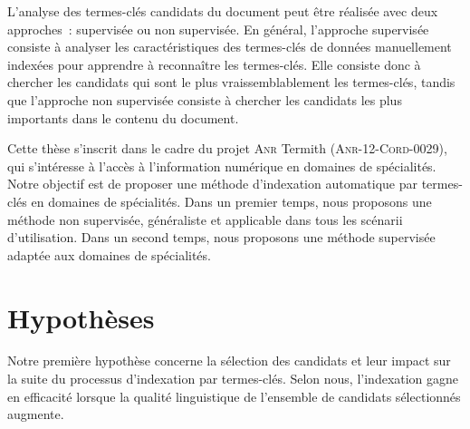     L'analyse des termes-clés candidats du document peut être réalisée avec deux
    approches~: supervisée ou non supervisée. En général, l'approche supervisée
    consiste à analyser les caractéristiques des termes-clés de données
    manuellement indexées pour apprendre à reconnaître les termes-clés. Elle
    consiste donc à chercher les candidats qui sont le plus vraissemblablement
    les termes-clés, tandis que l'approche non supervisée consiste à chercher
    les candidats les plus importants dans le contenu du document.

    Cette thèse s'inscrit dans le cadre du projet \textsc{Anr} Termith
    (\textsc{Anr-12-Cord-0029}), qui s'intéresse à l'accès à l'information
    numérique en domaines de spécialités. Notre objectif est de proposer une
    méthode d'indexation automatique par termes-clés en domaines de spécialités.
    Dans un premier temps, nous proposons une méthode non supervisée,
    généraliste et applicable dans tous les scénarii d'utilisation. Dans un
    second temps, nous proposons une méthode supervisée adaptée aux domaines de
    spécialités.


  \section{Hypothèses}
  \label{sec:main-introduction-hypothesis}
    Notre première hypothèse concerne la sélection des candidats et leur impact
    sur la suite du processus d'indexation par termes-clés. Selon nous,
    l'indexation gagne en efficacité lorsque la qualité linguistique de
    l'ensemble de candidats sélectionnés augmente. 
    
